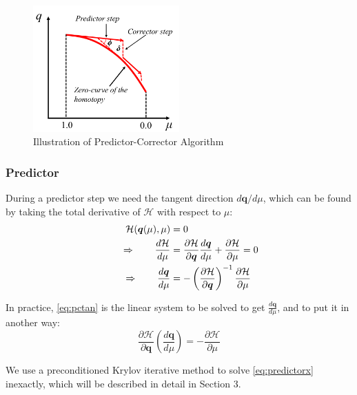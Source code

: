 \documentclass{article}
\theoremstyle{definition}
\begin{document}
\begin{figure}[H]
  \centering
  \includegraphics[width=0.5\textwidth]{./figs/PC_graph.png}
  \caption{Illustration of Predictor-Corrector Algorithm}
  \label{fig:pc}
\end{figure}

\subsubsection{Predictor}
During a predictor step we need the tangent direction $d\boldsymbol{q}/d\mu$, which can be found by taking the total derivative of $\mathcal{H}$ with respect to $\mu$:
\begin{align}\label{eq:pctan}
\ \ \qquad \mathcal{H}(\boldsymbol{q}(\mu), \mu) &= 0 \notag \\
\Rightarrow \qquad \frac{d \mathcal{H} }{d \mu} &= 
\frac{\partial \mathcal{H}}{\partial \boldsymbol{q}} \frac{d \boldsymbol{q} }{d \mu} + \frac{\partial \mathcal{H}}{\partial \mu} = 0  \notag \\
\Rightarrow \qquad \frac{d \boldsymbol{q} }{d \mu} &= - \left( \frac{\partial \mathcal{H}}{\partial \boldsymbol{q}}\right)^{-1} \frac{\partial \mathcal{H}}{\partial \mu}  
\end{align}

In practice, \eqref{eq:pctan} is the linear system to be solved to get $\frac{d \boldsymbol{q} }{d \mu} $, and to put it in another way: 
\begin{equation}\label{eq:predictorx}
\frac{\partial \mathcal{H}}{\partial \boldsymbol{q}} \left( \frac{d \boldsymbol{q} }{d \mu}\right) = -\frac{\partial \mathcal{H}}{\partial \mu}
\end{equation}

We use a preconditioned Krylov iterative method to solve \eqref{eq:predictorx} inexactly, which will be described in detail in Section 3. 
\end{document}
